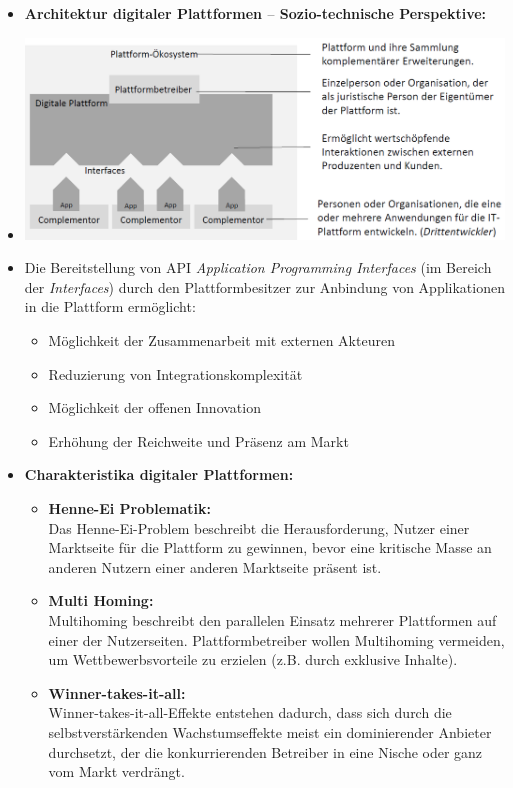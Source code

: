 \documentclass[12pt,a4paper]{article}
\begin{document}
\begin{itemize}
   \item \textbf{Architektur digitaler Plattformen $–$ Sozio-technische Perspektive:}
   \item[] \includegraphics[scale=0.43]{ArchitekturDigitalerPlattformen.png}
   \item[] Die Bereitstellung von API \textit{Application Programming Interfaces} (im Bereich der \textit{Interfaces}) durch den Plattformbesitzer zur Anbindung von Applikationen in die Plattform ermöglicht:
         \begin{itemize}
            \item Möglichkeit der Zusammenarbeit mit externen Akteuren
            \item Reduzierung von Integrationskomplexität
            \item Möglichkeit der offenen Innovation
            \item Erhöhung der Reichweite und Präsenz am Markt
         \end{itemize}
   
   \item \textbf{Charakteristika digitaler Plattformen:}
         \begin{itemize}
            \item \textbf{Henne-Ei Problematik:}\\
                  Das Henne-Ei-Problem beschreibt die Herausforderung, Nutzer einer Marktseite für die Plattform zu gewinnen, bevor eine kritische Masse an anderen Nutzern einer anderen Marktseite präsent ist.
            \item \textbf{Multi Homing:}\\
                  Multihoming beschreibt den parallelen Einsatz mehrerer Plattformen auf einer der Nutzerseiten.
                  Plattformbetreiber wollen Multihoming vermeiden, um Wettbewerbsvorteile zu erzielen (z.B. durch exklusive Inhalte).
            \item \textbf{Winner-takes-it-all:}\\
                  Winner-takes-it-all-Effekte entstehen dadurch, dass sich durch die selbst\-ver\-stärk\-en\-den Wachstumseffekte meist ein dominierender Anbieter durchsetzt, der die konkurrierenden Betreiber in eine Nische oder ganz vom Markt verdrängt.
         \end{itemize}
\end{itemize}
\end{document}
